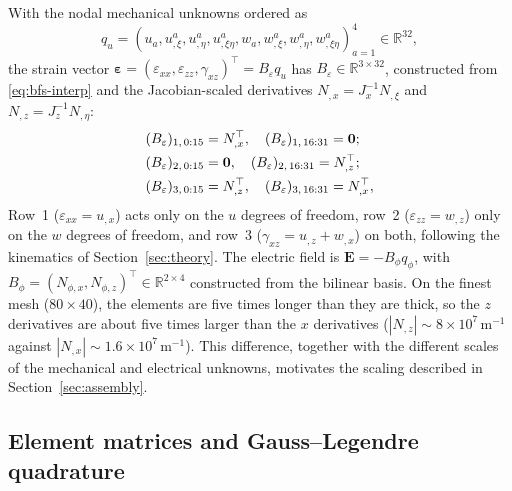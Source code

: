 \documentclass[a4paper, 11pt, twoside]{article}
\begin{document}
With the nodal mechanical unknowns ordered as
\[
q_u=(u_a,u_{,\xi}^a,u_{,\eta}^a,u_{,\xi\eta}^a,
w_a,w_{,\xi}^a,w_{,\eta}^a,w_{,\xi\eta}^a)_{a=1}^{4}\in\mathbb{R}^{32},
\]
the strain vector
$\bm\varepsilon=(\varepsilon_{xx},\varepsilon_{zz},\gamma_{xz})^\top
=B_\varepsilon q_u$ has $B_\varepsilon\in\mathbb{R}^{3\times32}$, constructed from
\eqref{eq:bfs-interp} and the Jacobian-scaled derivatives
$N_{,x}=J_x^{-1}N_{,\xi}$ and $N_{,z}=J_z^{-1}N_{,\eta}$:
\begin{align}
(B_\varepsilon)_{1,\,0:15}&=N_{,x}^\top,\quad
(B_\varepsilon)_{1,\,16:31}=\bm0;\notag\\
(B_\varepsilon)_{2,\,0:15}&=\bm0,\quad
(B_\varepsilon)_{2,\,16:31}=N_{,z}^\top;\notag\\
(B_\varepsilon)_{3,\,0:15}&=N_{,z}^\top,\quad
(B_\varepsilon)_{3,\,16:31}=N_{,x}^\top,
\label{eq:Beps}
\end{align}
Row~1 ($\varepsilon_{xx}=u_{,x}$) acts only on the $u$ degrees of freedom,
row~2 ($\varepsilon_{zz}=w_{,z}$) only on the $w$ degrees of freedom, and row~3
($\gamma_{xz}=u_{,z}+w_{,x}$) on both, following the kinematics of
Section~\ref{sec:theory}. The electric field is
$\bm E=-B_\phi q_\phi$, with
$B_\phi=(N_{\phi,x},N_{\phi,z})^\top\in\mathbb{R}^{2\times4}$ constructed from the
bilinear basis. On the finest mesh ($80\times40$), the elements are five times longer
than they are thick, so the $z$ derivatives are about five times larger than the
$x$ derivatives ($|N_{,z}|\sim8\times10^{7}\,\text{m}^{-1}$ against
$|N_{,x}|\sim1.6\times10^{7}\,\text{m}^{-1}$). This difference, together with the
different scales of the mechanical and electrical unknowns, motivates the scaling
described in Section~\ref{sec:assembly}.

\subsection{Element matrices and Gauss--Legendre quadrature}
\end{document}
